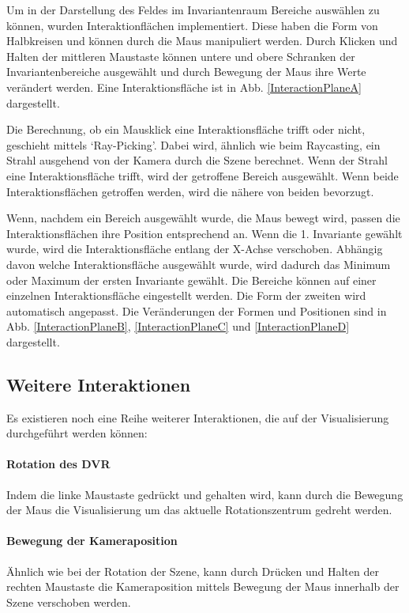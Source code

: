\documentclass[a4paper,fontsize=12pt,toc=bib,halfparskip]{scrartcl}
\begin{document}
Um in der Darstellung des Feldes im Invariantenraum Bereiche ausw\"ahlen zu k\"onnen, wurden Interaktionfl\"achen implementiert. Diese haben die Form von Halbkreisen und k\"onnen durch die Maus manipuliert werden. Durch Klicken und Halten der mittleren Maustaste k\"onnen untere und obere Schranken der Invariantenbereiche ausgew\"ahlt und durch Bewegung der Maus ihre Werte ver\"andert werden. Eine Interaktionsfl\"ache ist in Abb. \ref{InteractionPlaneA} dargestellt. 

Die Berechnung, ob ein Mausklick eine Interaktionsfl\"ache trifft oder nicht, geschieht mittels `Ray-Picking'. Dabei wird, \"ahnlich wie beim Raycasting, ein Strahl ausgehend von der Kamera durch die Szene berechnet. Wenn der Strahl eine Interaktionsfl\"ache trifft, wird der getroffene Bereich ausgew\"ahlt. Wenn beide Interaktionsfl\"achen getroffen werden, wird die n\"ahere von beiden bevorzugt.

Wenn, nachdem ein Bereich ausgew\"ahlt wurde, die Maus bewegt wird, passen die Interaktionsfl\"achen ihre Position entsprechend an. Wenn die 1. Invariante gew\"ahlt wurde, wird die Interaktionsfl\"ache entlang der X-Achse verschoben. Abh\"angig davon welche Interaktionsfl\"ache ausgew\"ahlt wurde, wird dadurch das Minimum oder Maximum der ersten Invariante gew\"ahlt. Die Bereiche k\"onnen auf einer einzelnen Interaktionsfl\"ache eingestellt werden. Die Form der zweiten wird automatisch angepasst. Die Ver\"anderungen der Formen und Positionen sind in Abb. \ref{InteractionPlaneB}, \ref{InteractionPlaneC} und  \ref{InteractionPlaneD} dargestellt. 

\subsection{Weitere Interaktionen}
Es existieren noch eine Reihe weiterer Interaktionen, die auf der Visualisierung durchgef\"uhrt werden k\"onnen:
\paragraph{Rotation des DVR}
Indem die linke Maustaste gedr\"uckt und gehalten wird, kann durch die Bewegung der Maus die Visualisierung um das aktuelle Rotationszentrum gedreht werden.
\paragraph{Bewegung der Kameraposition}
\"Ahnlich wie bei der Rotation der Szene, kann durch Dr\"ucken und Halten der rechten Maustaste die Kameraposition mittels Bewegung der Maus innerhalb der Szene verschoben werden.
\end{document}
